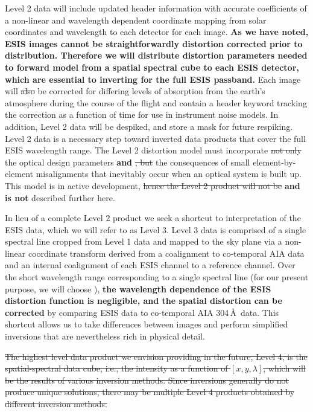 Level 2 data will include updated header information with accurate coefficients of a non-linear and wavelength dependent coordinate mapping from solar coordinates and wavelength to each detector for each image.
\textbf{As we have noted, ESIS images cannot be straightforwardly distortion corrected prior to distribution.
Therefore we will distribute distortion parameters needed to forward model from a spatial spectral cube to each ESIS detector, which are essential to inverting for the full ESIS passband. }
Each image will \sout{also} be corrected for differing levels of absorption from the earth's atmosphere during the course of the flight and contain a header keyword tracking the correction as a function of time for use in instrument noise models.
In addition, Level 2 data will be despiked, and store a mask for future respiking.
Level 2 data is a necessary step toward inverted data products that cover the full ESIS wavelength range. 
The Level 2 distortion model must incorporate \sout{not only} the optical design parameters \textbf{and} \sout{, but} the consequences of small element-by-element misalignments that inevitably occur when an optical system is built up.  
This model is in active development, \sout{hence the Level 2 product will not be} \textbf{and is not} described further here.


In lieu of a complete Level 2 product we seek a shortcut to interpretation of the ESIS data, which  we will refer to as Level 3.
Level 3 data is comprised of a single spectral line cropped from Level 1 data and mapped to the sky plane via a non-linear coordinate transform derived from a coalignment to co-temporal AIA data and an internal coalignment of each ESIS channel to a reference channel. 
Over the short wavelength range corresponding to a single spectral line (for our present purpose, we will choose \ov), \textbf{the wavelength dependence of the ESIS distortion function is negligible, and the spatial distortion can be corrected} by comparing ESIS data to co-temporal AIA 304\,\AA\ data. 
This shortcut allows us to take differences between images and perform simplified inversions that are nevertheless rich in physical detail.

\sout{The highest level data product we envision providing in the future, Level 4, is the spatial-spectral data cube, i.e., the intensity as a function of $[x, y , \lambda]$, which will be the results of various inversion methods.    
Since inversions generally do not produce unique solutions, there may be multiple Level 4 products obtained by different inversion methods.}
   

